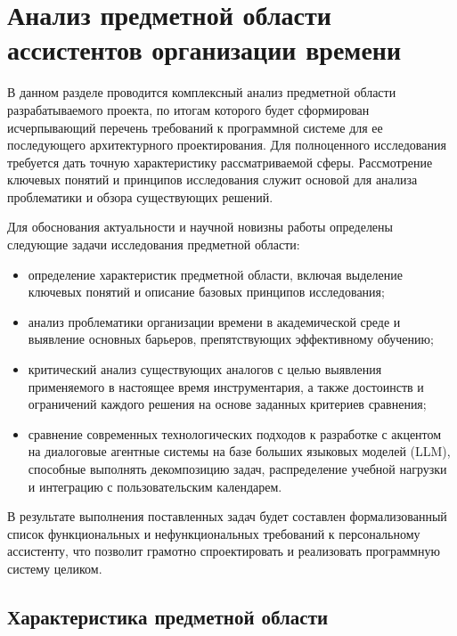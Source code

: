 \section{Анализ предметной области ассистентов организации времени}
\label{sec:analysis}


В данном разделе проводится комплексный анализ предметной области разрабатываемого проекта, по итогам которого будет сформирован исчерпывающий перечень требований к программной системе для ее последующего архитектурного проектирования. Для полноценного исследования требуется дать точную характеристику рассматриваемой сферы. Рассмотрение ключевых понятий и принципов исследования служит основой для анализа проблематики и обзора существующих решений.

Для обоснования актуальности и научной новизны работы определены следующие задачи исследования предметной области:

\begin{itemize}
    \item определение характеристик предметной области, включая выделение ключевых понятий и описание базовых принципов исследования;

    \item анализ проблематики организации времени в академической среде и выявление основных барьеров, препятствующих эффективному обучению;

    \item критический анализ существующих аналогов с целью выявления применяемого в настоящее время инструментария, а также достоинств и ограничений каждого решения на основе заданных критериев сравнения;

    \item сравнение современных технологических подходов к разработке с акцентом на диалоговые агентные системы на базе больших языковых моделей (LLM), способные выполнять декомпозицию задач, распределение учебной нагрузки и интеграцию с пользовательским календарем.

\end{itemize}

В результате выполнения поставленных задач будет составлен формализованный список функциональных и нефункциональных требований к персональному ассистенту, что позволит грамотно спроектировать и реализовать программную систему целиком.


\subsection{Характеристика предметной области}

